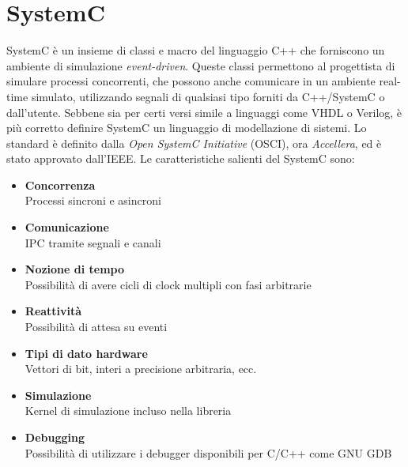 \documentclass[10pt,a4paper,oneside]{scrbook}
\begin{document}
\chapter{SystemC}
SystemC è un insieme di classi e macro del linguaggio C++ che forniscono un ambiente di simulazione \textit{event-driven}.
Queste classi permettono al progettista di simulare processi concorrenti,  che possono anche comunicare in un ambiente
real-time simulato, utilizzando segnali di qualsiasi tipo forniti da C++/SystemC o dall'utente.
Sebbene sia per certi versi simile a linguaggi come VHDL o Verilog, è più corretto definire SystemC un linguaggio di
modellazione di sistemi.
Lo standard è definito dalla \textit{Open SystemC Initiative} (OSCI), ora \textit{Accellera}, ed è stato
approvato dall'IEEE. Le caratteristiche salienti del SystemC sono:
\begin{itemize}
    \item \textbf{Concorrenza}\\
    Processi sincroni e asincroni
    \item \textbf{Comunicazione}\\
    IPC tramite segnali e canali
    \item \textbf{Nozione di tempo}\\
    Possibilità di avere cicli di clock multipli con fasi arbitrarie
    \item \textbf{Reattività}\\
    Possibilità di attesa su eventi
    \item \textbf{Tipi di dato hardware}\\
    Vettori di bit, interi a precisione arbitraria, ecc.
    \item \textbf{Simulazione}\\
    Kernel di simulazione incluso nella libreria
    \item \textbf{Debugging}\\
    Possibilità di utilizzare i debugger disponibili per C/C++ come GNU GDB
\end{itemize}
\end{document}
